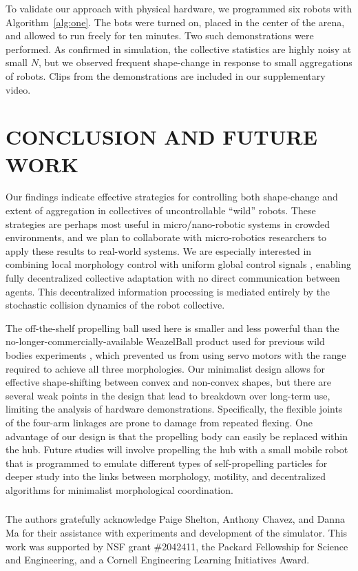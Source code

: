 \documentclass[runningheads]{llncs}
\begin{document}
To validate our approach with physical hardware, we programmed six robots with Algorithm~\ref{alg:one}. The bots were turned on, placed in the center of the arena, and allowed to run freely for ten minutes. Two such demonstrations were performed. As confirmed in simulation, the collective statistics are highly noisy at small $N$, but we observed frequent shape-change in response to small aggregations of robots. Clips from the demonstrations are included in our supplementary video.



\section{CONCLUSION AND FUTURE WORK}

Our findings indicate effective strategies for controlling both shape-change and extent of aggregation in collectives of uncontrollable ``wild'' robots. These strategies are perhaps most useful in micro/nano-robotic systems in crowded environments, and we plan to collaborate with micro-robotics researchers to apply these results to real-world systems. We are especially interested in combining local morphology control with uniform global control signals \cite{becker2014reconfiguring}, enabling fully decentralized collective adaptation with no direct communication between agents. This decentralized information processing is mediated entirely by the stochastic collision dynamics of the robot collective.

The off-the-shelf propelling ball used here is smaller and less powerful than the no-longer-commercially-available WeazelBall product used for previous wild bodies experiments \cite{nilles2019hardware}, which prevented us from using servo motors with the range required to achieve all three morphologies. Our minimalist design allows for effective shape-shifting between convex and non-convex shapes, but there are several weak points in the design that lead to breakdown over long-term use, limiting the analysis of hardware demonstrations. Specifically, the flexible joints of the four-arm linkages are prone to damage from repeated flexing. One advantage of our design is that the propelling body can easily be replaced within the hub. Future studies will involve propelling the hub with a small mobile robot that is programmed to emulate different types of self-propelling particles for deeper study into the links between morphology, motility, and decentralized algorithms for minimalist morphological coordination.

\begin{credits}
\subsubsection{\ackname} 
The authors gratefully acknowledge Paige Shelton, Anthony Chavez, and Danna Ma for their assistance with experiments and development of the simulator. This work was supported by NSF grant \#2042411, the Packard Fellowship for Science and Engineering, and a Cornell Engineering Learning Initiatives Award.
\end{credits}



\end{document}
